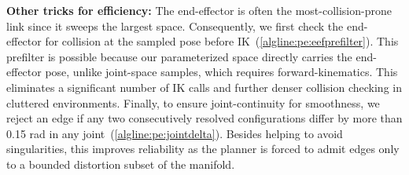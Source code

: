 \documentclass[letterpaper, 10 pt, conference]{ieeeconf}
\begin{document}
\textbf{Other tricks for efficiency:}
The end-effector is often the most-collision-prone link since it sweeps the largest space. Consequently, we first check the end-effector for collision at the sampled pose before IK~(\cref{algline:pe:eefprefilter}).
This prefilter is possible because our parameterized space directly carries the end-effector pose, unlike joint-space samples, which requires forward-kinematics. This eliminates a significant number of IK calls and further denser collision checking in cluttered environments. Finally, to ensure joint-continuity for smoothness, we reject an edge if any two consecutively resolved configurations differ by more than 0.15 rad in any joint~(\cref{algline:pe:jointdelta}). Besides helping to avoid singularities, this improves reliability as the planner is forced to admit edges only to a bounded distortion subset of the manifold.







\end{document}
